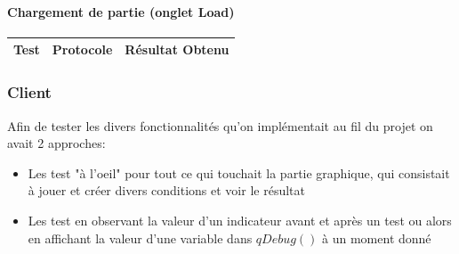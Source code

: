 \documentclass[a4paper,10pt,openany,oneside]{report}
\begin{document}
\paragraph{Chargement de partie (onglet Load)}
\begin{center}
	\begin{tabular}{| p{3cm} | p{6cm} | p{6cm} |}
	\hline
		 \textbf{Test} & \textbf{Protocole} & \textbf{Résultat Obtenu}
		 \\ \hline
		\hline
	\end{tabular}
\end{center}

\subsubsection{Client}
Afin de tester les divers fonctionnalités qu'on implémentait au fil du projet on avait 2 approches:
\begin{itemize}
\item Les test "à l'oeil" pour tout ce qui touchait la partie graphique, qui consistait à jouer et créer divers conditions et voir le résultat
\
\item Les test en observant la  valeur d'un indicateur avant et après un test ou alors en affichant la valeur d'une variable dans $qDebug()$ à un moment donné

\end{itemize}
\end{document}
